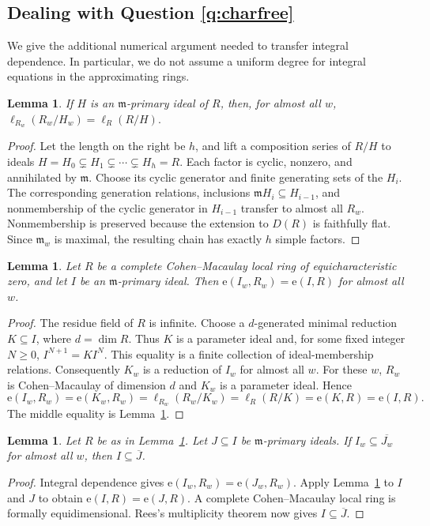 \documentclass[11pt,a4paper]{amsart}
\numberwithin{equation}{section}
\newtheorem{lemma}[theorem]{Lemma}
\DeclareMathOperator{\length}{\ell}\DeclareMathOperator{\len}{\ell}
\newcommand{\m}{\mathfrak m}
\newcommand{\ol}[1]{\overline{#1}}
\newcommand{\e}{\mathrm e}
\begin{document}
 
 
 \subsection{Dealing with {Question} \ref{q:charfree}}
 We give the additional numerical argument needed to transfer
 integral dependence.  In particular, we do not assume a uniform
 degree for integral equations in the approximating rings.
 
 \begin{lemma}\label{lem:length}
 	If $H$ is an $\m$-primary ideal of $R$, then, for almost all $w$,
 	$\length_{R_w}(R_w/H_w)=\length_R(R/H).$
 \end{lemma}
 \begin{proof}
 	Let the length on the right be $h$, and lift a composition series
 	of $R/H$ to ideals
 	$	H=H_0\subsetneq H_1\subsetneq\cdots\subsetneq H_h=R.$
 	Each factor is cyclic, nonzero, and annihilated by $\m$.
 	Choose its cyclic generator and finite generating sets of the
 	$H_i$.  The corresponding generation relations, inclusions
 	$\m H_i\subseteq H_{i-1}$, and nonmembership of the cyclic generator
 	in $H_{i-1}$ transfer to almost all $R_w$.
 	Nonmembership is preserved because the extension to $D(R)$ is
 	faithfully flat.  Since $\m_w$ is maximal, the resulting chain
 	has exactly $h$ simple factors.
 \end{proof}
 
 \begin{lemma}\label{lem:multiplicity}
 	Let $R$ be a complete Cohen--Macaulay local ring of
 	equicharacteristic zero, and let $I$ be an $\m$-primary ideal.  Then
 	$ \e(I_w,R_w)=\e(I,R) $
 	for almost all $w$.
 \end{lemma}
 \begin{proof}
 	The residue field of $R$ is infinite.  Choose a $d$-generated
 	minimal reduction $K\subseteq I$, where $d=\dim R$.  Thus $K$ is
 	a parameter ideal and, for some fixed integer $N\geq0$,
 	$ I^{N+1}=KI^N. $ 
 	This equality is a finite collection of ideal-membership
 	relations.  Consequently $K_w$ is a reduction of $I_w$ for
 	almost all $w$.  For these $w$, $R_w$ is Cohen--Macaulay of
 	dimension $d$ and $K_w$ is a parameter ideal.  Hence
 	$$	\e(I_w,R_w)
 	=\e(K_w,R_w)
 	=\length_{R_w}(R_w/K_w)
 	=\length_R(R/K)
 	=\e(K,R)
 	=\e(I,R).	$$
 	The middle equality is Lemma~\ref{lem:length}.
 \end{proof}
 
 \begin{lemma}
 	\label{lem:integraltransfer}
 	Let $R$ be as in Lemma~\ref{lem:multiplicity}.  Let
 	$J\subseteq I$ be $\m$-primary ideals.  If
 	$I_w\subseteq\ol{J_w}$ for almost all $w$, then
 	$I\subseteq\ol J$.
 \end{lemma}
 \begin{proof}
 	Integral dependence gives $\e(I_w,R_w)=\e(J_w,R_w)$.
 	Apply Lemma~\ref{lem:multiplicity} to $I$ and $J$ to obtain
 	$\e(I,R)=\e(J,R)$.  A complete Cohen--Macaulay local ring is
 	formally equidimensional.  Rees's multiplicity theorem
 	\cite[Theorem 11.3.1]{HSbook} now gives $I\subseteq\ol J$.
 \end{proof}
 
\end{document}

